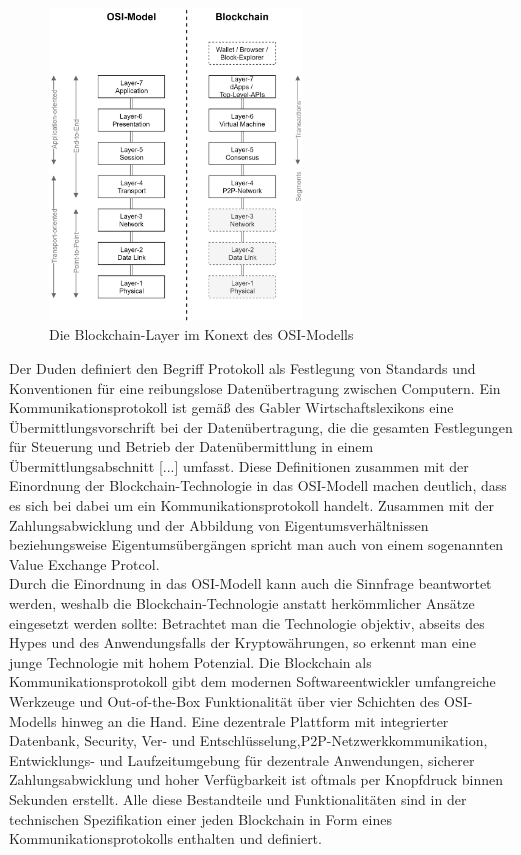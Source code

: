 \begin{figure}[htbp]
 \centering
 \includegraphics[width=0.6\textwidth]{gfx/osi_blockchain.png}
 \caption{Die Blockchain-Layer im Konext des OSI-Modells}
 \label{fig:chapter02:osi_blockchain}
\end{figure}

Der Duden definiert den Begriff Protokoll als \glqq Festlegung von Standards und Konventionen für eine reibungslose Datenübertragung zwischen Computern\grqq. Ein Kommunikationsprotokoll ist gemäß des Gabler Wirtschaftslexikons \glqq eine Übermittlungsvorschrift bei der Datenübertragung, die die gesamten Festlegungen für Steuerung und Betrieb der Datenübermittlung in einem Übermittlungsabschnitt [...] umfasst\grqq. Diese Definitionen zusammen mit der Einordnung der Blockchain-Technologie in das \ac{OSI}-Modell machen deutlich, dass es sich bei dabei um ein Kommunikationsprotokoll handelt. Zusammen mit der Zahlungsabwicklung und der Abbildung von Eigentumsverhältnissen beziehungsweise Eigentumsübergängen spricht man auch von einem sogenannten \glqq Value Exchange Protcol\grqq \cite{bheemaiah2015}.\\
Durch die Einordnung in das \ac{OSI}-Modell kann auch die Sinnfrage beantwortet werden, weshalb die Blockchain-Technologie anstatt herkömmlicher Ansätze eingesetzt werden sollte: Betrachtet man die Technologie objektiv, abseits des Hypes und des Anwendungsfalls der Kryptowährungen, so erkennt man eine junge Technologie mit hohem Potenzial. Die Blockchain als Kommunikationsprotokoll gibt dem modernen Softwareentwickler umfangreiche Werkzeuge und Out-of-the-Box Funktionalität über vier Schichten des \ac{OSI}-Modells hinweg an die Hand. Eine dezentrale Plattform mit integrierter Datenbank, Security, Ver- und Entschlüsselung,\ac{P2P}-Netzwerkkommunikation, Entwicklungs- und Laufzeitumgebung für dezentrale Anwendungen, sicherer Zahlungsabwicklung und hoher Verfügbarkeit ist oftmals per Knopfdruck binnen Sekunden erstellt. Alle diese Bestandteile und Funktionalitäten sind in der technischen Spezifikation einer jeden Blockchain in Form eines Kommunikationsprotokolls enthalten und definiert.

